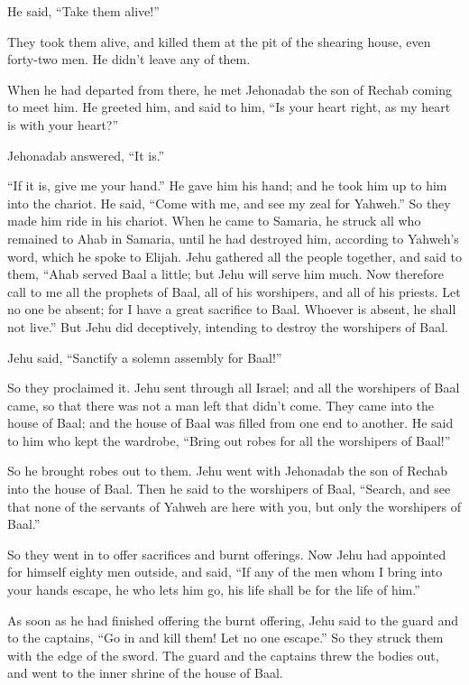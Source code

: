 {\par }{\PP {}He said, “Take them alive!”
\par }{\PP They took them alive, and killed them at the pit of the shearing house, even forty-two men. He didn’t leave any of them.
\par }{\PP {}When he had departed from there, he met Jehonadab the son of Rechab coming to meet him. He greeted him, and said to him, “Is your heart right, as my heart is with your heart?”
\par }{\PP Jehonadab answered, “It is.”
\par }{\PP “If it is, give me your hand.” He gave him his hand; and he took him up to him into the chariot.
He said, “Come with me, and see my zeal for Yahweh.” So they made him ride in his chariot.
When he came to Samaria, he struck all who remained to Ahab in Samaria, until he had destroyed him, according to Yahweh’s word, which he spoke to Elijah.
Jehu gathered all the people together, and said to them, “Ahab served Baal a little; but Jehu will serve him much.
Now therefore call to me all the prophets of Baal, all of his worshipers, and all of his priests. Let no one be absent; for I have a great sacrifice to Baal. Whoever is absent, he shall not live.” But Jehu did deceptively, intending to destroy the worshipers of Baal.
\par }{\PP {}Jehu said, “Sanctify a solemn assembly for Baal!”
\par }{\PP So they proclaimed it.
Jehu sent through all Israel; and all the worshipers of Baal came, so that there was not a man left that didn’t come. They came into the house of Baal; and the house of Baal was filled from one end to another.
He said to him who kept the wardrobe, “Bring out robes for all the worshipers of Baal!”
\par }{\PP So he brought robes out to them.
Jehu went with Jehonadab the son of Rechab into the house of Baal. Then he said to the worshipers of Baal, “Search, and see that none of the servants of Yahweh are here with you, but only the worshipers of Baal.”
\par }{\PP {}So they went in to offer sacrifices and burnt offerings. Now Jehu had appointed for himself eighty men outside, and said, “If any of the men whom I bring into your hands escape, he who lets him go, his life shall be for the life of him.”
\par }{\PP {}As soon as he had finished offering the burnt offering, Jehu said to the guard and to the captains, “Go in and kill them! Let no one escape.” So they struck them with the edge of the sword. The guard and the captains threw the bodies out, and went to the inner shrine of the house of Baal.
}
